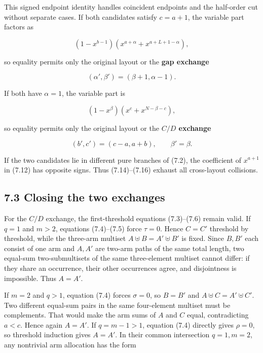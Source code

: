 \documentclass[11pt]{article}
\begin{document}
This signed endpoint identity handles coincident endpoints and the half-order cut without separate
cases. If both candidates satisfy $c=a+1$, the variable part factors as

\begin{equation*}
(1-x^{b-1})(x^{a+\alpha}+x^{a+L+1-\alpha}),
\tag{7.13}
\end{equation*}


so equality permits only the original layout or the \textbf{gap exchange}

\begin{equation*}
(\alpha',\beta')=(\beta+1,\alpha-1).
\tag{7.14}
\end{equation*}


If both have $\alpha=1$, the variable part is

\begin{equation*}
(1-x^\beta)(x^c+x^{N-\beta-c}),
\tag{7.15}
\end{equation*}


so equality permits only the original layout or the \textbf{$C/D$ exchange}

\begin{equation*}
(b',c')=(c-a,a+b),\qquad\beta'=\beta.
\tag{7.16}
\end{equation*}


If the two candidates lie in different pure branches of (7.2), the coefficient of $x^{a+1}$ in
(7.12) has opposite signs. Thus (7.14)--(7.16) exhaust all cross-layout collisions.

\Needspace{0.13\textheight}
\subsection*{7.3 Closing the two exchanges}


For the $C/D$ exchange, the first-threshold equations (7.3)--(7.6) remain valid. If $q=1$ and
$m>2$, equations (7.4)--(7.5) force $\tau=0$. Hence $C=C'$ threshold by threshold, while the
three-arm multiset $A\mathbin{\uplus}B=A'\mathbin{\uplus}B'$ is fixed. Since $B,B'$ each consist
of one arm and $A,A'$ are two-arm paths of the same total length, two equal-sum two-submultisets of
the same three-element multiset cannot differ: if they share an occurrence, their other occurrences
agree, and disjointness is impossible. Thus $A=A'$.

If $m=2$ and $q>1$, equation (7.4) forces $\sigma=0$, so $B=B'$ and
$A\mathbin{\uplus}C=A'\mathbin{\uplus}C'$. Two different equal-sum pairs in the same four-element
multiset must be complements. That would make the arm sums of $A$ and $C$ equal, contradicting
$a<c$. Hence again $A=A'$. If $q=m-1>1$, equation (7.4) directly gives $\rho=0$, so threshold
induction gives $A=A'$. In their common intersection $q=1,m=2$, any nontrivial arm allocation has
the form
\end{document}
